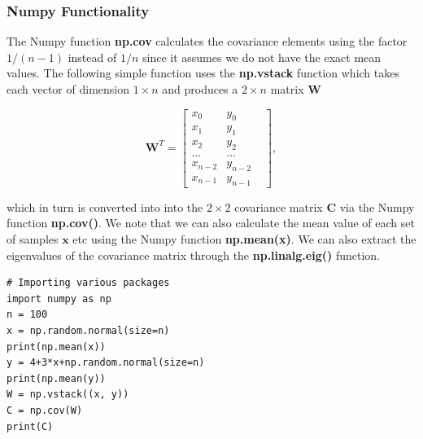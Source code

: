 \documentclass{beamer}
\begin{document}
\begin{frame}
\frametitle{Numpy Functionality}

The Numpy function \textbf{np.cov} calculates the covariance elements using
the factor $1/(n-1)$ instead of $1/n$ since it assumes we do not have
the exact mean values.  The following simple function uses the
\textbf{np.vstack} function which takes each vector of dimension $1\times n$
and produces a $2\times n$ matrix $\bm{W}$

\[
\bm{W}^T = \begin{bmatrix} x_0 & y_0 \\
                          x_1 & y_1 \\
                          x_2 & y_2\\
                          \dots & \dots \\
                          x_{n-2} & y_{n-2}\\
                          x_{n-1} & y_{n-1} & 
             \end{bmatrix},
\]

which in turn is converted into into the $2\times 2$ covariance matrix
$\bm{C}$ via the Numpy function \textbf{np.cov()}. We note that we can also calculate
the mean value of each set of samples $\bm{x}$ etc using the Numpy
function \textbf{np.mean(x)}. We can also extract the eigenvalues of the
covariance matrix through the \textbf{np.linalg.eig()} function.












\begin{verbatim}
# Importing various packages
import numpy as np
n = 100
x = np.random.normal(size=n)
print(np.mean(x))
y = 4+3*x+np.random.normal(size=n)
print(np.mean(y))
W = np.vstack((x, y))
C = np.cov(W)
print(C)

\end{verbatim}
\end{frame}
\end{document}
